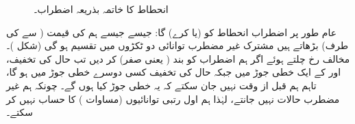 \begin{figure}
\centering
{}
\caption{انحطاط کا خاتمہ بذریعہ اضطراب۔}
\label{شکل_غیر_تابع_اضطراب_اختتام_انحطاط}
\end{figure}


عام طور پر اضطراب  انحطاط کو  (یا  کرے) گا: جیسے جیسے ہم  کی قیمت (  سے  کی طرف) بڑھاتے ہیں مشترک غیر مضطرب توانائی  دو ٹکڑوں میں تقسیم ہو گی (شکل )۔ مخالف رخ چلتے ہوئے اگر ہم اضطراب کو بند ( یعنی صفر) کر دیں تب  حال کی تخفیف،  اور  کے ایک خطی جوڑ میں جبکہ حال کی تخفیف کسی دوسرے  خطی جوڑ میں ہو گا، تاہم ہم قبل از وقت نہیں جان سکتے کہ یہ خطی جوڑ کیا ہوں گے۔ چونکہ ہم غیر مضطرب حالات نہیں جانتے، لہٰذا ہم اول رتبی توانائیوں (مساوات ) کا حساب نہیں کر سکتے۔ 

